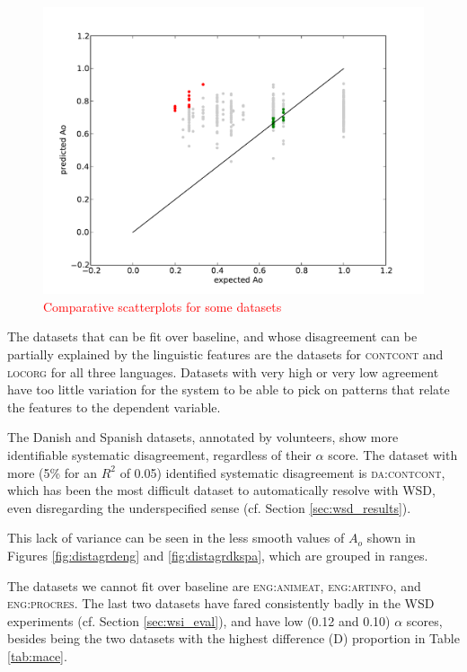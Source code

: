 \documentclass[11pt,a4paper]{article}
\begin{document}
\begin{figure}[htt]
\includegraphics[scale=0.25]{scatterdraft.pdf}

\caption{ \label{fig:reglit_dklocorg}\textcolor{red}{Comparative scatterplots for some datasets}}    
\end{figure}
The datasets that can be fit over baseline, and whose disagreement can be partially explained by the linguistic features are the datasets for \textsc{contcont} and \textsc{locorg} for all three languages. Datasets with very high or very low agreement have too little variation for the system to be able to pick on patterns that relate the features to the dependent variable. 

The Danish and Spanish datasets, annotated by volunteers, show more identifiable systematic disagreement, regardless of their $\alpha$ score. The dataset with more (5\% for an $R^2$ of 0.05) identified systematic disagreement is \textsc{da:contcont}, which has been the most difficult dataset to automatically resolve with WSD, even disregarding the underspecified sense (cf. Section \ref{sec:wsd_results}). 


%
%





This lack of variance can be seen in the less smooth values of $A_o$ shown in Figures \ref{fig:distagrdeng} and \ref{fig:distagrdkspa}, which are grouped in ranges.

The datasets we cannot fit over baseline are \textsc{eng:animeat}, \textsc{eng:artinfo}, and \textsc{eng:procres}. The last two datasets have fared consistently badly in the WSD experiments (cf. Section \ref{sec:wsi_eval}), and have low (0.12 and 0.10) $\alpha$ scores, besides being the two datasets with the highest difference (D) proportion in Table \ref{tab:mace}. 
\end{document}
